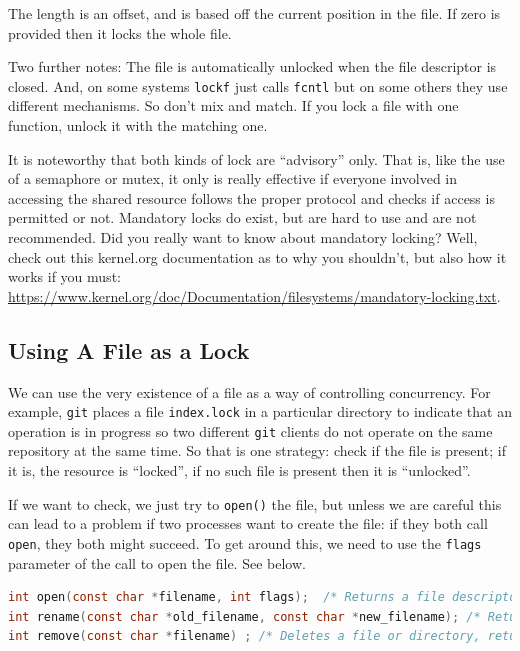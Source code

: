 \documentclass[a4paper]{report}
\begin{document}
The length is an offset, and is based off the current position in the file. If zero is provided then it locks the whole file.

Two further notes: The file is automatically unlocked when the file descriptor is closed. And, on some systems \texttt{lockf} just calls \texttt{fcntl} but on some others they use different mechanisms. So don't mix and match. If you lock a file with one function, unlock it with the matching one.

It is noteworthy that both kinds of lock are ``advisory'' only. That is, like the use of a semaphore or mutex, it only is really effective if everyone involved in accessing the shared resource follows the proper protocol and checks if access is permitted or not. Mandatory locks do exist, but are hard to use and are not recommended. Did you really want to know about mandatory locking? Well, check out this kernel.org documentation as to why you shouldn't, but also how it works if you must: \url{https://www.kernel.org/doc/Documentation/filesystems/mandatory-locking.txt}.

\subsection*{Using A File as a Lock}

We can use the very existence of a file as a way of controlling concurrency. For example, \texttt{git} places a file \texttt{index.lock} in a particular directory to indicate that an operation is in progress so two different \texttt{git} clients do not operate on the same repository at the same time. So that is one strategy: check if the file is present; if it is, the resource is ``locked'', if no such file is present then it is ``unlocked''.

If we want to check, we just try to \texttt{open()} the file, but unless we are careful this can lead to a problem if two processes want to create the file: if they both call \texttt{open}, they both might succeed. To get around this, we need to use the \texttt{flags} parameter of the call to open the file. See below.

\begin{lstlisting}[language=C]
int open(const char *filename, int flags);  /* Returns a file descriptor if successful, -1 on error */
int rename(const char *old_filename, const char *new_filename); /* Returns 0 on success , operates atomically */
int remove(const char *filename) ; /* Deletes a file or directory, returns 0 on success, operates atomically */ 
\end{lstlisting}
\end{document}
